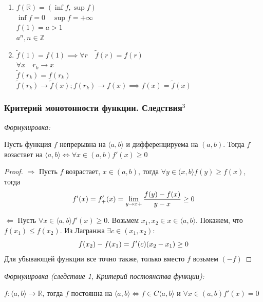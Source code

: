 \documentclass{article}
\begin{document}
\begin{enumerate}
    \item $f(\mathbb{R}) = (\inf{f}, \sup{f})$\\
    $\inf{f} = 0 \quad \sup{f} = +\infty$\\
    $f(1) = a > 1$\\
    $a^n, n\in \mathbb{Z}$
    
    \item $\tilde f(1) = f(1) \implies \forall r \quad \tilde f(r) = f(r)$\\
    $\forall x \quad r_k \rightarrow x$\\
    $\tilde f(r_k) = f(r_k)$\\
    $\tilde f(r_k) \rightarrow \tilde f(x); f(r_k) \rightarrow f(x) \implies f(x) = \tilde f(x)$
\end{enumerate}

\subsubsection{Критерий монотонности функции. Следствия\texorpdfstring{$^3$}{}}


\textit{Формулировка: }

Пусть функция $f$ непрерывна на $\langle a, b\rangle$ и дифференцируема на $(a, b)$. Тогда $f$ возастает на $\langle a, b\rangle \Leftrightarrow \forall x \in (a, b) f'(x) \geq 0$

\begin{proof}
\item{$\Rightarrow$}
Пусть $f$ возрастает, $x \in (a, b)$, тогда $\forall y \in (x, b\rangle f(y) \geq f(x) $, тогда
\begin{equation}
f'(x) = f_+'(x) = \lim_{y\to x+} \frac{f(y) - f(x)}{y - x} \geq 0 \notag
\end{equation}
\item{$\Leftarrow$}
Пусть $\forall x \in \langle a, b\rangle f'(x) \geq 0$. Возьмем $x_1, x_2 \in x \in \langle a, b\rangle$. Покажем, что $f(x_1) \leq f(x_2)$. Из Лагранжа $\exists c \in (x_1, x_2):$
\begin{equation}
f(x_2) - f(x_1) = f'(c)(x_2 - x_1) \geq 0 \notag
\end{equation}
Для убывающей функции все точно также, только вместо $f$ возьмем $(-f)$
\end{proof}

\textit{Формулировка (следствие 1, Критерий постоянства функции): }

$f:\langle a, b\rangle \rightarrow \mathbb{R}$, тогда $f$ постоянна на $\langle a, b\rangle \Leftrightarrow f \in C\langle a, b\rangle$ и $ \forall x \in (a, b) f'(x) = 0$
\end{document}
